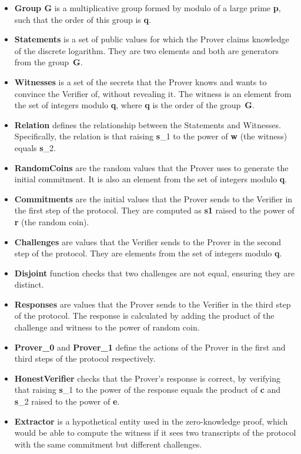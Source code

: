 \begin{itemize}
\item \textbf{Group G} is a multiplicative group formed by modulo of a large prime \textbf{p}, such that the order of this group is \textbf{q}.
    \item \textbf{Statements} is a set of public values for which the Prover claims knowledge of the discrete logarithm. They are two elements and both are generators from the group~\textbf{G}.
    \item \textbf{Witnesses}  is a set of the secrets that the Prover knows and wants to convince the Verifier of, without revealing it. The witness is an element from the set of integers modulo \textbf{q}, where \textbf{q} is the order of the group~\textbf{G}.
    \item \textbf{Relation} defines the relationship between the Statements and Witnesses. Specifically, the relation is that raising \textbf{s}_1 to the power of \textbf{w} (the witness) equals \textbf{s}_2.
    \item \textbf{RandomCoins}  are the random values that the Prover uses to generate the initial commitment. It is also an element from the set of integers modulo \textbf{q}.
    \item \textbf{Commitments}  are the initial values that the Prover sends to the Verifier in the first step of the protocol. They are computed as \textbf{s1} raised to the power of \textbf{r} (the random coin).
    \item \textbf{Challenges}  are values that the Verifier sends to the Prover in the second step of the protocol. They are elements from the set of integers modulo \textbf{q}.
    \item \textbf{Disjoint} function checks that two challenges are not equal, ensuring they are distinct.
    \item \textbf{Responses}  are values that the Prover sends to the Verifier in the third step of the protocol. The response is calculated by adding the product of the challenge and witness to the power of random coin.
    \item \textbf{Prover\_0} and \textbf{Prover\_1}  define the actions of the Prover in the first and third steps of the protocol respectively.
    \item \textbf{HonestVerifier}  checks that the Prover's response is correct, by verifying that raising \textbf{s}_1 to the power of the response equals the product of \textbf{c} and \textbf{s}_2 raised to the power of \textbf{e}.
    \item \textbf{Extractor}  is a hypothetical entity used in the zero-knowledge proof, which would be able to compute the witness if it sees two transcripts of the protocol with the same commitment but different challenges.

\end{itemize}
